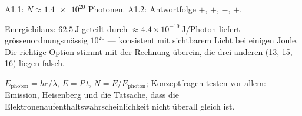 \begin{ergebnis}
A1.1: $N \approx \num{1.4e20}$ Photonen. A1.2: Antwortfolge
$+$, $+$, $-$, $+$.
\end{ergebnis}

\begin{kontrolle}
Energiebilanz: $62.5\ \mathrm{J}$ geteilt durch
$\approx 4.4\times10^{-19}\ \mathrm{J/Photon}$ liefert grössenordnungsmässig
$10^{20}$ --- konsistent mit sichtbarem Licht bei einigen Joule. Die
richtige Option stimmt mit der Rechnung überein, die drei anderen (13, 15,
16) liegen falsch.
\end{kontrolle}

\begin{merksatz}
$E_{\text{photon}} = hc/\lambda$, $E = P\,t$, $N = E/E_{\text{photon}}$;
Konzeptfragen testen vor allem: Emission, Heisenberg und die Tatsache, dass
die Elektronenaufenthaltswahrscheinlichkeit nicht überall gleich ist.
\end{merksatz}
